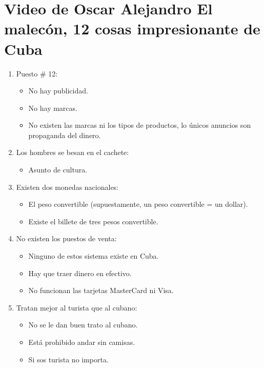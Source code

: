 \section{Video de Oscar Alejandro El malecón, 12 cosas impresionante de Cuba}
\begin{enumerate}
    \item Puesto \# 12: 
        \begin{itemize}
            \item No hay publicidad.
            \item No hay marcas.
            \item No existen las marcas ni los tipos de productos, lo únicos anuncios son propaganda del dinero.
        \end{itemize}

    \item Los hombres se besan en el cachete: 
        \begin{itemize}
            \item Asunto de cultura.
        \end{itemize}
    
    \item Existen dos monedas nacionales:
        \begin{itemize}
            \item El peso convertible (supuestamente, un peso convertible = un dollar).
            \item Existe el billete de tres pesos convertible.
        \end{itemize}
    
    \item No existen los puestos de venta:
        \begin{itemize}
            \item Ninguno de estos sistema existe en Cuba. 
            \item Hay que traer dinero en efectivo.
            \item No funcionan las tarjetas MasterCard ni Visa.
        \end{itemize}
    
    \item Tratan mejor al turista que al cubano: 
        \begin{itemize}
            \item No se le dan buen trato al cubano.
            \item Está prohibido andar sin camisas.
            \item Si sos turista no importa.
        \end{itemize}
    

\end{enumerate}

